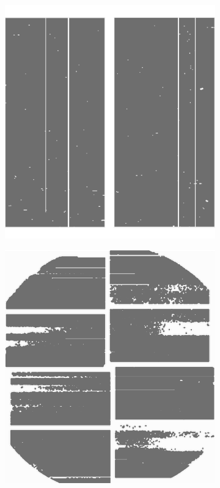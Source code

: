 \begin{figure}
	\centering
	\begin{subfigure}{0.2\textwidth}
		\includegraphics[width=\linewidth]{images/mask_dual.png}
	\end{subfigure}
	\hspace{1cm}
	\begin{subfigure}{0.2\textwidth}
		\includegraphics[width=\linewidth]{images/mask_octal.png}

\end{subfigure}
\end{figure}
